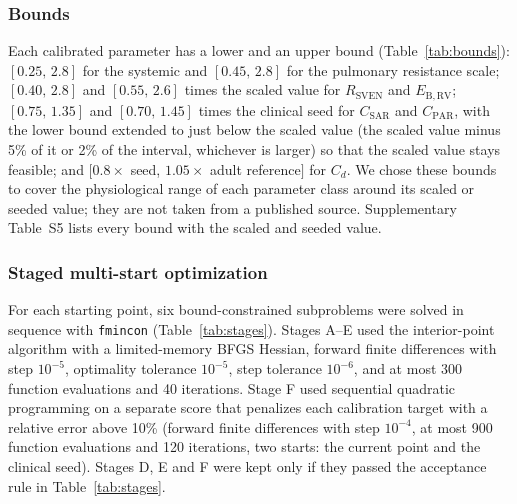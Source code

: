 \documentclass{article}
\begin{document}
\subsubsection{Bounds}
Each calibrated parameter has a lower and an upper bound (Table~\ref{tab:bounds}): $[0.25,\,2.8]$ for the systemic and $[0.45,\,2.8]$ for the pulmonary resistance scale; $[0.40,\,2.8]$ and $[0.55,\,2.6]$ times the scaled value for $R_{\mathrm{SVEN}}$ and $E_{\mathrm{B,RV}}$; $[0.75,\,1.35]$ and $[0.70,\,1.45]$ times the clinical seed for $C_{\mathrm{SAR}}$ and $C_{\mathrm{PAR}}$, with the lower bound extended to just below the scaled value (the scaled value minus 5\% of it or 2\% of the interval, whichever is larger) so that the scaled value stays feasible; and $[0.8\times$ seed, $1.05\times$ adult reference$]$ for $C_d$. We chose these bounds to cover the physiological range of each parameter class around its scaled or seeded value; they are not taken from a published source. Supplementary Table~S5 lists every bound with the scaled and seeded value.

\subsubsection{Staged multi-start optimization}
For each starting point, six bound-constrained subproblems were solved in sequence with \texttt{fmincon} (Table~\ref{tab:stages}). Stages A--E used the interior-point algorithm with a limited-memory BFGS Hessian, forward finite differences with step $10^{-5}$, optimality tolerance $10^{-5}$, step tolerance $10^{-6}$, and at most 300 function evaluations and 40 iterations. Stage F used sequential quadratic programming on a separate score that penalizes each calibration target with a relative error above 10\% (forward finite differences with step $10^{-4}$, at most 900 function evaluations and 120 iterations, two starts: the current point and the clinical seed). Stages D, E and F were kept only if they passed the acceptance rule in Table~\ref{tab:stages}.
\end{document}
